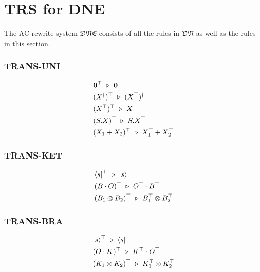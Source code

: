 
\section{TRS for DNE}

\begin{definition}
    The AC-rewrite system $\mathfrak{DNE}$ consists of all the rules in $\mathfrak{DN}$ as well as the rules in this section.
\end{definition}

\subsubsection*{\textsf{TRANS-UNI}}
\begin{align*}
  & \mathbf{0}^\top \ \triangleright\  \mathbf{0} \\
  & (X^\dagger)^\top \ \triangleright\  (X^\top)^\dagger \\
  & (X^\top)^\top \ \triangleright\  X \\
  & (S . X)^\top \ \triangleright\  S . X^\top \\
  & (X_1 + X_2)^\top \ \triangleright\  X_1^\top + X_2^\top \\
\end{align*}

\subsubsection*{\textsf{TRANS-KET}}
\begin{align*}
  & \langle s|^\top \ \triangleright\  |s\rangle \\
  & (B \cdot O)^\top \ \triangleright\  O^\top \cdot B^\top \\
  & (B_1 \otimes B_2)^\top \ \triangleright\  B_1^\top \otimes B_2^\top
\end{align*}

\subsubsection*{\textsf{TRANS-BRA}}
\begin{align*}
  & |s\rangle^\top \ \triangleright\  \langle s| \\
  & (O \cdot K)^\top \ \triangleright\  K^\top \cdot O^\top \\
  & (K_1 \otimes K_2)^\top \ \triangleright\  K_1^\top \otimes K_2^\top
\end{align*}

